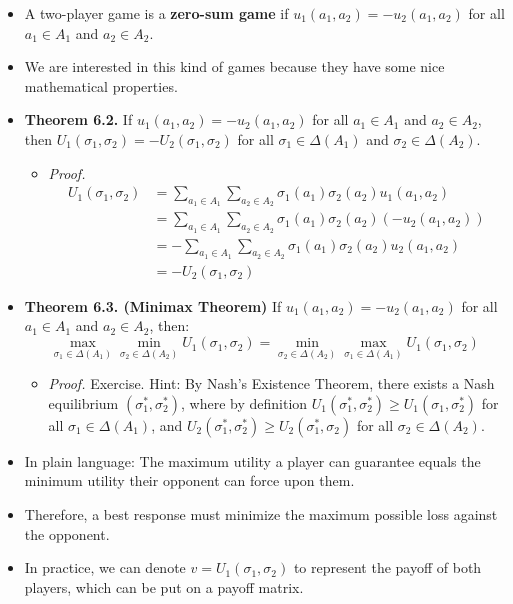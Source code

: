 \documentclass[notitlepage]{article}
\begin{document}
\begin{itemize}
    \item A two-player game is a \textbf{zero-sum game} if \(u_1(a_1, a_2) = -u_2(a_1, a_2)\) for all \(a_1 \in A_1\) and \(a_2 \in A_2\).
    \item We are interested in this kind of games because they have some nice mathematical properties.
    \item \textbf{Theorem 6.2.} If \(u_1(a_1, a_2) = -u_2(a_1, a_2)\) for all \(a_1 \in A_1\) and \(a_2 \in A_2\), then \(U_1(\sigma_1, \sigma_2) = -U_2(\sigma_1, \sigma_2)\) for all \(\sigma_1 \in \Delta(A_1)\) and \(\sigma_2 \in \Delta(A_2)\).
    \begin{itemize}
        \item \textit{Proof.}
        \begin{align*}
        U_1(\sigma_1, \sigma_2) &= \sum_{a_1 \in A_1} \sum_{a_2 \in A_2} \sigma_1(a_1) \sigma_2(a_2) u_1(a_1, a_2) \\
        &= \sum_{a_1 \in A_1} \sum_{a_2 \in A_2} \sigma_1(a_1) \sigma_2(a_2) (-u_2(a_1, a_2)) \\
        &= -\sum_{a_1 \in A_1} \sum_{a_2 \in A_2} \sigma_1(a_1) \sigma_2(a_2) u_2(a_1, a_2) \\
        &= -U_2(\sigma_1, \sigma_2)
        \end{align*}

    \end{itemize}
    \item \textbf{Theorem 6.3. (Minimax Theorem)} If \(u_1(a_1, a_2) = -u_2(a_1, a_2)\) for all \(a_1 \in A_1\) and \(a_2 \in A_2\), then:
    \[
    \max_{\sigma_1 \in \Delta(A_1)} \min_{\sigma_2 \in \Delta(A_2)} U_1(\sigma_1, \sigma_2) = \min_{\sigma_2 \in \Delta(A_2)} \max_{\sigma_1 \in \Delta(A_1)}  U_1(\sigma_1, \sigma_2)
    \]
    \begin{itemize}
        \item \textit{Proof.} Exercise. Hint: By Nash's Existence Theorem, there exists a Nash equilibrium \((\sigma^*_1,\sigma^*_2)\), where by definition \(U_1(\sigma^*_1,\sigma^*_2) \ge U_1(\sigma_1,\sigma^*_2)\) for all \(\sigma_1 \in \Delta(A_1)\), and \(U_2(\sigma^*_1,\sigma^*_2) \ge U_2(\sigma_1^*,\sigma_2)\) for all \(\sigma_2 \in \Delta(A_2)\).
    \end{itemize}
    \item In plain language: The maximum utility a player can guarantee equals the minimum utility their opponent can force upon them.
    \item Therefore, a best response must minimize the maximum possible loss against the opponent.
    \item In practice, we can denote \(v = U_1(\sigma_1, \sigma_2)\) to represent the payoff of both players, which can be put on a payoff matrix.


\end{itemize}
\end{document}
